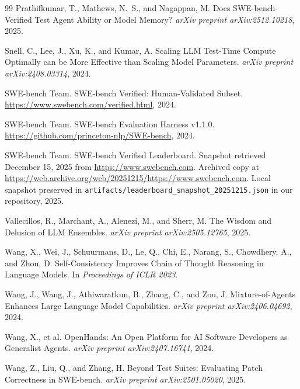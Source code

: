 \documentclass[11pt,a4paper]{article}
\begin{document}
\begin{thebibliography}{99}
Prathifkumar, T., Mathews, N.~S., and Nagappan, M.
\newblock Does SWE-bench-Verified Test Agent Ability or Model Memory?
\newblock \emph{arXiv preprint arXiv:2512.10218}, 2025.

Snell, C., Lee, J., Xu, K., and Kumar, A.
\newblock Scaling LLM Test-Time Compute Optimally can be More Effective than Scaling Model Parameters.
\newblock \emph{arXiv preprint arXiv:2408.03314}, 2024.

SWE-bench Team.
\newblock SWE-bench Verified: Human-Validated Subset.
\newblock \url{https://www.swebench.com/verified.html}, 2024.

SWE-bench Team.
\newblock SWE-bench Evaluation Harness v1.1.0.
\newblock \url{https://github.com/princeton-nlp/SWE-bench}, 2024.

SWE-bench Team.
\newblock SWE-bench Verified Leaderboard.
\newblock Snapshot retrieved December 15, 2025 from \url{https://www.swebench.com}. Archived copy at \url{https://web.archive.org/web/20251215/https://www.swebench.com}. Local snapshot preserved in \texttt{artifacts/leaderboard\_snapshot\_20251215.json} in our repository, 2025.

Vallecillos, R., Marchant, A., Alenezi, M., and Sherr, M.
\newblock The Wisdom and Delusion of LLM Ensembles.
\newblock \emph{arXiv preprint arXiv:2505.12765}, 2025.

Wang, X., Wei, J., Schuurmans, D., Le, Q., Chi, E., Narang, S., Chowdhery, A., and Zhou, D.
\newblock Self-Consistency Improves Chain of Thought Reasoning in Language Models.
\newblock In \emph{Proceedings of ICLR 2023}.

Wang, J., Wang, J., Athiwaratkun, B., Zhang, C., and Zou, J.
\newblock Mixture-of-Agents Enhances Large Language Model Capabilities.
\newblock \emph{arXiv preprint arXiv:2406.04692}, 2024.

Wang, X., et al.
\newblock OpenHands: An Open Platform for AI Software Developers as Generalist Agents.
\newblock \emph{arXiv preprint arXiv:2407.16741}, 2024.

Wang, Z., Liu, Q., and Zhang, H.
\newblock Beyond Test Suites: Evaluating Patch Correctness in SWE-bench.
\newblock \emph{arXiv preprint arXiv:2501.05020}, 2025.


\end{thebibliography}
\end{document}
